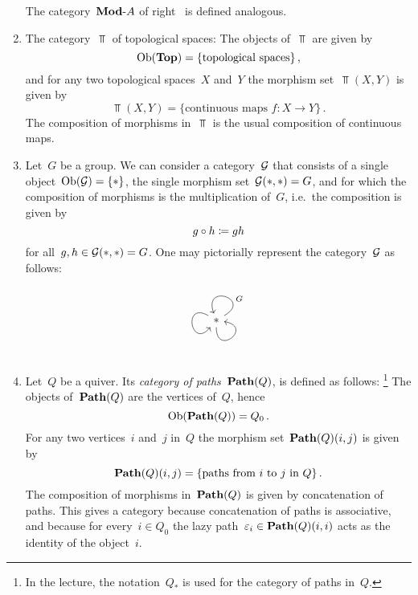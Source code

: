 \begin{example}
\begin{enumerate}
      The category~$\text{$\mathbf{Mod}$-$A$}$ of right~{} is defined analogous.
    \item
      The category~$\Top$ of topological spaces:
      The objects of~$\Top$ are given by
      \[
          \operatorname{Ob}(\mathbf{Top})
        = \{
            \text{topological spaces}
          \} \,,
      \]
      and for any two topological spaces~$X$ and~$Y$ the morphism set~$\Top(X,Y)$ is given by
      \[
          \Top(X,Y)
        = \{
            \text{continuous maps~$f \colon X \to Y$}
          \} \,.
      \]
      The composition of morphisms in~$\Top$ is the usual composition of continuous maps.
    \item
      Let~$G$ be a group.
      We can consider a category~$\mathcal{G}$ that consists of a single object~$\operatorname{Ob}(\mathcal{G}) = \{ \ast \}$, the single morphism set~$\mathcal{G}(\ast,\ast) = G$, and for which the composition of morphisms is the multiplication of~$G$, i.e.\ the composition is given by
      \[
                  g \circ h
        \coloneqq  gh
      \]
      for all~$g, h \in \mathcal{G}(\ast,\ast) = G$.
      One may pictorially represent the category~$\mathcal{G}$ as follows:
      \[
        \begin{tikzcd}
          \ast
          \arrow[out=30,in=110,loop]{}[above right, near start]{G}
          \arrow[out=150,in=230,loop,looseness=6.5]
          \arrow[out=270,in=350,loop]
        \end{tikzcd}
      \]
    \item
      Let~$Q$ be a quiver.
      Its \emph{category of paths}~$\mathbf{Path}(Q)$, is defined as follows:%
      \footnote{In the lecture, the notation~$Q_*$ is used for the category of paths in~$Q$.}
      The objects of~$\mathbf{Path}(Q)$ are the vertices of~$Q$, hence
      \[
          \operatorname{Ob}(\mathbf{Path}(Q))
        = Q_0 \,.
      \]
      For any two vertices~$i$ and~$j$ in~$Q$ the morphism set~$\mathbf{Path}(Q)(i,j)$ is given by
      \[
          \mathbf{Path}(Q)(i,j)
        = \{
            \text{paths from~$i$ to~$j$ in~$Q$}
          \} \,.
      \]
      The composition of morphisms in~$\mathbf{Path}(Q)$ is given by concatenation of paths.
      This gives a category because concatenation of paths is associative, and because for every~$i \in Q_0$ the lazy path~$\varepsilon_i \in \mathbf{Path}(Q)(i,i)$ acts as the identity of the object~$i$.
  \end{enumerate}
\end{example}


